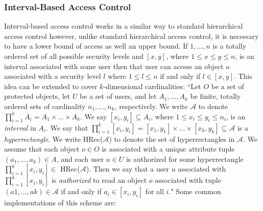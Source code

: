 \documentclass[12pt, titlepage]{article}
\begin{document}
\subsubsection{Interval-Based Access Control}
Interval-based access control works in a similar way to standard hierarchical access control however, unlike standard hierarchical access control, it is necessary to have a lower bound of access as well an upper bound. If $1, \dots , n$ is a totally ordered set of all possible security levels and $[x,y]$, where $1≤x≤y≤n$, is an interval associated with some user then that user can access an object $o$ associated with a security level $l$ where $1≤l≤n$ if and only if $l ∈ [x,y]$.
\newline \indent This idea can be extended to cover $k$-dimensional cardinalities:
\newline \indent ``Let $O$ be a set of protected objects, let $U$ be a set of users, and let $A_{1}, \dots , A_{k}$ be finite, totally ordered sets of cardinality $n_{1} , \dots , n_{k}$, respectively. We write $\mathcal{A}$ to denote $\prod_{i=1}^k A_{i} = A_{1} \times \dots \times A_{k}$.  
\newline \indent We say $[x_{i},y_{i}] ⊆ A_{i}$, where $1≤x_{i}≤y_{i}≤n_{i}$, is an \textit{interval} in $A_{i}$. We say that $\prod_{i=1}^k [x_{i},y_{i}] = [x_{1},y_{1}] \times \dots \times [x_{k},y_{k}] ⊆ \mathcal{A}$ is a \textit{hyperrectangle}. We write HRec($\mathcal{A}$) to denote the set of hyperrectangles in $\mathcal{A}$.
\newline \indent We assume that each object $o ∈ O$ is associated with a unique attribute tuple $(a_{1} , \dots , a_{k}) ∈ A$, and each user $u ∈ U$ is authorized for some hyperrectangle $\prod_{i=1}^k [x_{i},y_{i}] ∈$ HRec($\mathcal{A}$). Then we say that a user $u$ associated with $\prod_{i=1}^k [x_{i},y_{i}]$ is \textit{authorized} to read an object $o$ associated with tuple $(a1 , . . . , ak) ∈ \mathcal{A}$ if and only if $a_{i} ∈ [x_{i},y_{i}]$ for all $i$\cite{mainPaper}."
\newline \indent Some common implementations of this scheme are\cite{mainPaper}:
\end{document}
